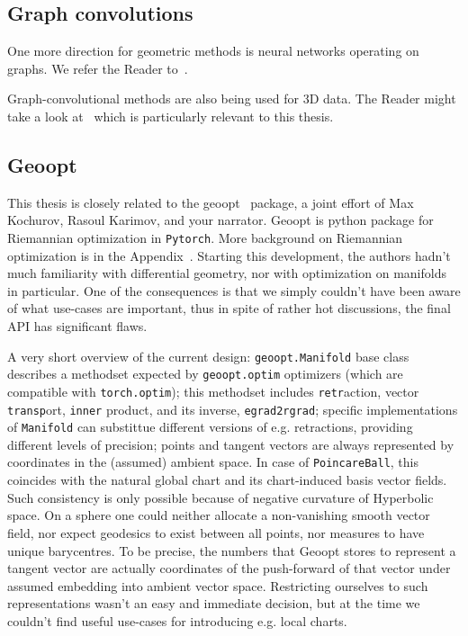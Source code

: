 \subsection{Graph convolutions}

One more direction for geometric methods is neural networks operating on graphs.
We refer the Reader to~\citet{kipf}.

Graph-convolutional methods are also being used for 3D data. The Reader might
take a look at~\citet{edgeconv} which is particularly relevant to this thesis.

\subsection{Geoopt} \label{sec:geoopt}

This thesis is closely related to the geoopt~\cite{geoopt} package, a joint
effort of Max Kochurov, Rasoul Karimov, and your narrator.
Geoopt is python package for Riemannian optimization in \texttt{Pytorch}.
More background on Riemannian optimization is in the Appendix~.
Starting this development, the authors hadn't much familiarity with
differential geometry, nor with optimization on manifolds in particular. One of
the consequences is that we simply couldn't have been aware of what use-cases
are important, thus in spite of rather hot discussions, the final API has
significant flaws.

A very short overview of the current design: \texttt{geoopt.Manifold} base
class describes a methodset expected by \texttt{geoopt.optim} optimizers (which
are compatible with \texttt{torch.optim}); this methodset includes
\texttt{retr}action, vector \texttt{transp}ort, \texttt{inner} product, and its
inverse, \texttt{egrad2rgrad}; specific implementations of \texttt{Manifold}
can substittue different versions of e.g. retractions, providing different
levels of precision; points and tangent vectors are always represented by
coordinates in the (assumed) ambient space. In case of \texttt{PoincareBall},
this coincides with the natural global chart and its chart-induced basis vector
fields. Such consistency is only possible because of negative curvature of
Hyperbolic space. On a sphere one could neither allocate a non-vanishing smooth
vector field, nor expect geodesics to exist between all points, nor measures to
have unique barycentres. To be precise, the numbers that Geoopt stores to
represent a tangent vector are actually coordinates of the push-forward of that
vector under assumed embedding into ambient vector space. Restricting ourselves
to such representations wasn't an easy and immediate decision, but at the time
we couldn't find useful use-cases for introducing e.g. local charts.


